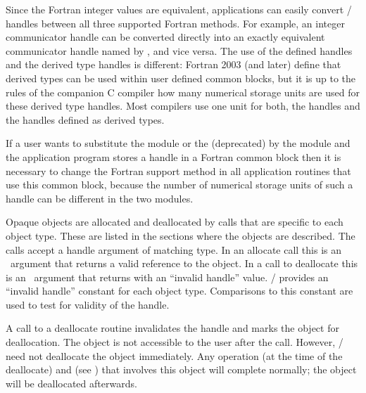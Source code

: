 \begin{rationale}
Since the Fortran integer values are equivalent, applications can easily
convert \MPI/ handles between all three supported Fortran methods.  For
example, an integer communicator handle  can be converted directly
into an exactly equivalent  communicator handle named 
by , and vice versa.
The use of the  defined handles and the
 derived type handles is different:
Fortran 2003 (and later) define that  derived types
can be used within user defined common blocks, but it is up to
the rules of the companion C compiler how many numerical storage units
are used for these  derived type handles.
Most compilers use one unit for both, the  handles and the handles defined as
 derived types.
\end{rationale}
\begin{users}
If a user wants to substitute the  module or the (deprecated) 
by the  module and the
application program stores a handle in a Fortran common block
then it is necessary to change the Fortran support method
in all application routines that use this common block,
because the number of numerical storage units of such a handle
can be different in the two modules.
\end{users}

Opaque objects are allocated and deallocated
by calls that are specific to each object type.
These are listed in the sections where the objects are described.
The calls accept a handle argument of matching type.
In an allocate call this is an \OUT\ argument that
returns a valid reference to the object.
In a call to deallocate this is an \INOUT\ argument that returns
with an ``invalid handle'' value.
\MPI/ provides an ``invalid handle'' constant
for each object type.  Comparisons to this constant are used to test for
validity of the handle.

A call to a deallocate routine invalidates the handle and marks the
object for deallocation.  The object is not accessible to the user
after the call.  However, \MPI/ need not deallocate the object
immediately.  Any operation  (at the time of the deallocate)
and  (see )
that involves this object will complete normally; the object will be
deallocated afterwards.

